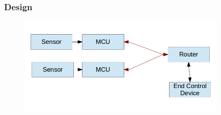 \documentclass{beamer}
\begin{document}
\begin{frame}
\frametitle{Design}
\begin{figure}[H]
 \centering
 \includegraphics[width=10cm]{designc}
\end{figure}
\end{frame}

\end{document}
